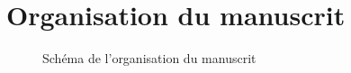 \documentclass[ twoside,openright,titlepage,numbers=noenddot,headinclude,%
                footinclude=true,cleardoublepage=empty,abstractoff, %
                BCOR=5mm,paper=a4,fontsize=11pt,%
                french,american,%
                ]{scrreprt}
\begin{document}
\section{Organisation du manuscrit}
%
\begin{figure}[h!]
    \centering
    \resizebox{0.95\textwidth}{!}{%
        
    }
    \caption{Schéma de l'organisation du manuscrit}
\end{figure}
\end{document}

